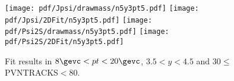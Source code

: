 \begin{figure}[H]
\begin{center}
\texttt{[image: pdf/Jpsi/drawmass/n5y3pt5.pdf]}
\texttt{[image: pdf/Jpsi/2DFit/n5y3pt5.pdf]}
\vspace*{-0.5cm}
\texttt{[image: pdf/Psi2S/drawmass/n5y3pt5.pdf]}
\texttt{[image: pdf/Psi2S/2DFit/n5y3pt5.pdf]}
\vspace*{-0.5cm}
\end{center}
\caption{Fit results in $8\gevc<pt<20\gevc$, $3.5<y<4.5$ and 30$\leq$PVNTRACKS$<$80.}
\label{Fitn5y3pt5}
\end{figure}
